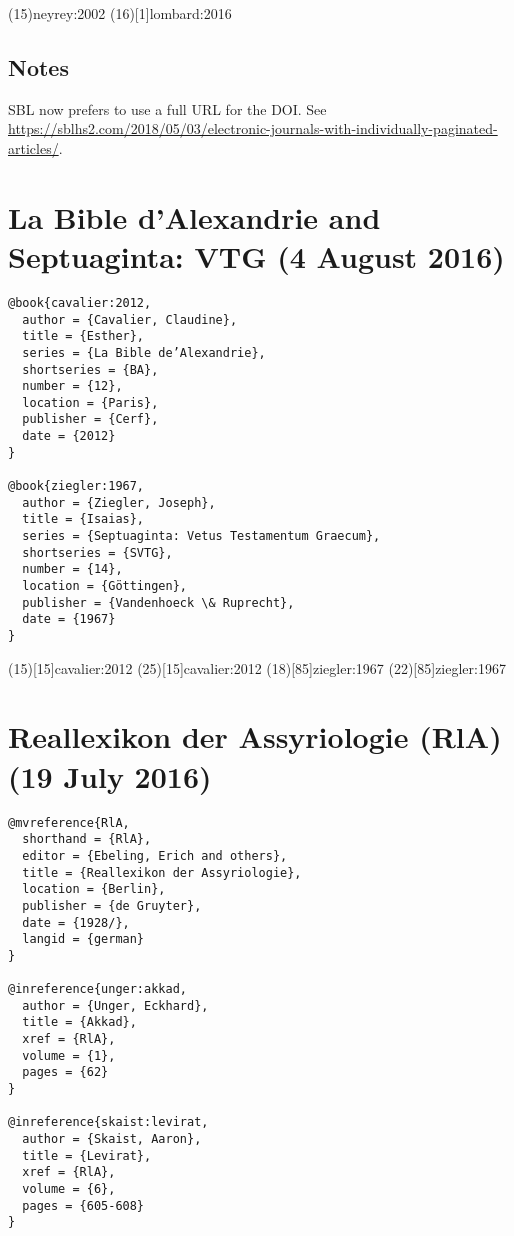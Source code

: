 \documentclass[a4paper]{article}
\begin{document}
\examplecite(15){neyrey:2002}
\examplecite(16)[1]{lombard:2016}
\exampleabbreviations
\examplebibliography

\subsection{Notes}

SBL now prefers to use a full URL for the DOI. See
\url{https://sblhs2.com/2018/05/03/electronic-journals-with-individually-paginated-articles/}.


\section{La Bible d’Alexandrie and Septuaginta: VTG (4 August 2016)}

\begin{verbatim}
@book{cavalier:2012,
  author = {Cavalier, Claudine},
  title = {Esther},
  series = {La Bible de’Alexandrie},
  shortseries = {BA},
  number = {12},
  location = {Paris},
  publisher = {Cerf},
  date = {2012}
}

@book{ziegler:1967,
  author = {Ziegler, Joseph},
  title = {Isaias},
  series = {Septuaginta: Vetus Testamentum Graecum},
  shortseries = {SVTG},
  number = {14},
  location = {Göttingen},
  publisher = {Vandenhoeck \& Ruprecht},
  date = {1967}
}
\end{verbatim}

\examplecite(15)[15]{cavalier:2012}
\examplecite(25)[15]{cavalier:2012}
\examplecite(18)[85]{ziegler:1967}
\examplecite(22)[85]{ziegler:1967}
\exampleabbreviations
\examplebibliography
{}

\section{Reallexikon der Assyriologie (RlA) (19 July 2016)}

\begin{verbatim}
@mvreference{RlA,
  shorthand = {RlA},
  editor = {Ebeling, Erich and others},
  title = {Reallexikon der Assyriologie},
  location = {Berlin},
  publisher = {de Gruyter},
  date = {1928/},
  langid = {german}
}

@inreference{unger:akkad,
  author = {Unger, Eckhard},
  title = {Akkad},
  xref = {RlA},
  volume = {1},
  pages = {62}
}

@inreference{skaist:levirat,
  author = {Skaist, Aaron},
  title = {Levirat},
  xref = {RlA},
  volume = {6},
  pages = {605-608}
}
\end{verbatim}
\end{document}
